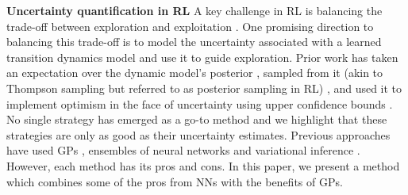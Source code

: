 \documentclass{article}
\begin{document}
\textbf{Uncertainty quantification in RL}
A key challenge in RL is balancing the trade-off between exploration and exploitation \cite{sutton2018reinforcement}.
One promising direction to balancing this trade-off is to model the uncertainty associated with a learned transition dynamics model and use it to guide exploration.
Prior work has taken an expectation over the dynamic model's posterior \cite{deisenroth2011pilco,kamtheDataEfficient2018,chuaDeepReinforcementLearning2018},
sampled from it (akin to Thompson sampling but referred to as posterior sampling in RL) \cite{dearden1999model,osbandMoreEfficientReinforcement2013},
and used it to implement optimism in the face of uncertainty using upper confidence bounds \cite{curiEfficient2020,jaksch2010near}.
No single strategy has emerged as a go-to method and we highlight that these strategies are only as good as their uncertainty estimates.
Previous approaches have used GPs \cite{deisenroth2011pilco,kamtheDataEfficient2018},
ensembles of neural networks \cite{curiEfficient2020,chuaDeepReinforcementLearning2018}
and variational inference \cite{galImproving2016,houthooftVIME2017}.
However, each method has its pros and cons.
In this paper, we present a method which combines some of the pros from NNs with the benefits of GPs.



\end{document}
